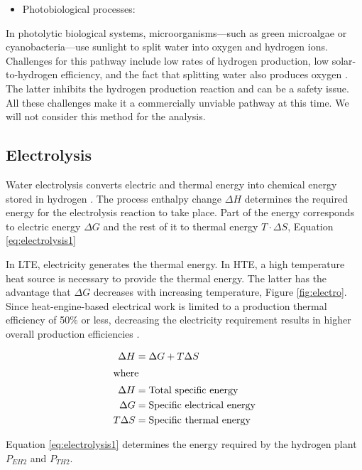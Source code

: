 \documentclass[11pt,letterpaper]{article}
\begin{document}
\begin{itemize}
	\item Photobiological processes:
\end{itemize}

In photolytic biological systems, microorganisms—such as green microalgae or cyanobacteria—use sunlight to split water into oxygen and hydrogen ions.
Challenges for this pathway include low rates of hydrogen production, low solar-to-hydrogen efficiency, and the fact that splitting water also produces oxygen \cite{doe_office_of_energy_efficiency_and_renewable_energy_hydrogen_2020}.
The latter inhibits the hydrogen production reaction and can be a safety issue.
All these challenges make it a commercially unviable pathway at this time.
We will not consider this method for the analysis.

\subsection{Electrolysis}

Water electrolysis converts electric and thermal energy into chemical energy stored in hydrogen \cite{hi2h2_highly_2007}.
The process enthalpy change $\Delta H$ determines the required energy for the electrolysis reaction to take place.
Part of the energy corresponds to electric energy $\Delta G$ and the rest of it to thermal energy $T \cdot \Delta S$, Equation \ref{eq:electrolysis1}

In \gls{LTE}, electricity generates the thermal energy.
In \gls{HTE}, a high temperature heat source is necessary to provide the thermal energy.
The latter has the advantage that $\Delta G$ decreases with increasing temperature, Figure \ref{fig:electro}.
Since heat-engine-based electrical work is limited to a production thermal efficiency of 50$\%$ or less, decreasing the electricity requirement results in higher overall production efficiencies \cite{j_e_obrien_high_2010}.

\begin{align}
	\Delta H &= \Delta G + T \Delta S\\
\label{eq:electrolysis1}
    \intertext{where}
    \Delta H &= \mbox{Total specific energy} \\
    \Delta G &= \mbox{Specific electrical energy} \\
    T \Delta S &= \mbox{Specific thermal energy} \\
\end{align}

Equation \ref{eq:electrolysis1} determines the energy required by the hydrogen plant $P_{EH2}$ and $P_{TH2}$.
\end{document}
